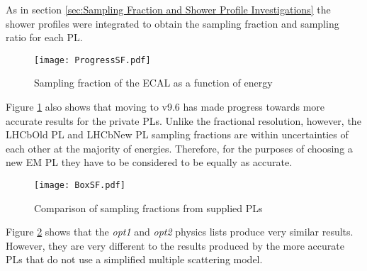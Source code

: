 As in section \ref{sec:Sampling Fraction and Shower Profile Investigations} the shower profiles were integrated to obtain the sampling fraction and sampling ratio for each PL.
\begin{figure}[h]
  \centering
  \texttt{[image: ProgressSF.pdf]}
  \caption{Sampling fraction of the ECAL as a function of energy}
  \label{fig:ProgressSF}
\end{figure}

Figure \ref{fig:ProgressSF} also shows that moving to \geant v9.6 has made progress towards more accurate results for the \lhcb private PLs.  Unlike the fractional resolution, however, the LHCbOld PL and LHCbNew PL sampling fractions are within uncertainties of each other at the majority of energies.  Therefore, for the purposes of choosing a new EM PL they have to be considered to be equally as accurate.

\begin{figure}[h]
  \centering
  \texttt{[image: BoxSF.pdf]}
  \caption{Comparison of sampling fractions from \geant supplied PLs}
  \label{fig:BoxSF}
\end{figure}
Figure \ref{fig:BoxSF} shows that the \textit{opt1} and \textit{opt2} physics lists produce very similar results.  However, they are very different to the results produced by the more accurate PLs that do not use a simplified multiple scattering model.

